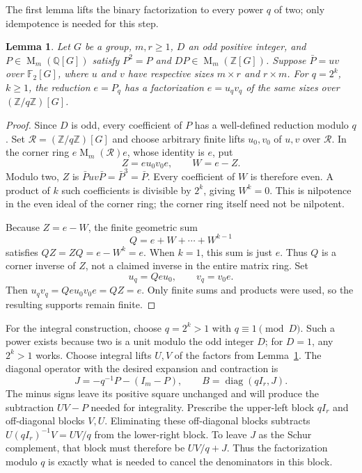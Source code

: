 \documentclass[11pt]{article}
\newtheorem{lemma}[theorem]{Lemma}
\theoremstyle{remark}
\numberwithin{equation}{section}
\newcommand{\F}{\mathbb F}
\newcommand{\Z}{\mathbb Z}
\newcommand{\Q}{\mathbb Q}
\newcommand{\Mat}{\operatorname{M}}
\newcommand{\diag}{\operatorname{diag}}
\begin{document}
The first lemma lifts the binary factorization to every
power $q$ of two; only idempotence is needed for this step.

\begin{lemma}\label{lem:lift}
Let $G$ be a group, $m,r\ge1$, $D$ an odd positive integer, and
$P\in\Mat_m(\Q[G])$ satisfy $P^2=P$ and
$DP\in\Mat_m(\Z[G])$. Suppose $\bar P=uv$ over $\F_2[G]$, where $u$ and $v$
have respective sizes $m\times r$ and $r\times m$. For $q=2^k$,
$k\ge1$, the reduction $e=P_q$ has a factorization
$e=u_qv_q$ of the same sizes over $(\Z/q\Z)[G]$.
\end{lemma}

\begin{proof}
Since $D$ is odd, every coefficient of $P$ has a well-defined
reduction modulo $q$. Set $\mathcal R=(\Z/q\Z)[G]$ and choose
arbitrary finite lifts $u_0,v_0$ of $u,v$ over $\mathcal R$.
In the corner ring $e\Mat_m(\mathcal R)e$, whose identity is $e$,
put
\[
 Z=eu_0v_0e,\qquad W=e-Z.
\]
Modulo two, $Z$ is $\bar Puv\bar P=\bar P^3=\bar P$.
Every coefficient of $W$ is therefore even. A product of $k$
such coefficients is divisible by $2^k$, giving $W^k=0$.
This is nilpotence in the even ideal of the corner ring; the
corner ring itself need not be nilpotent.

Because $Z=e-W$, the finite geometric sum
\[
 Q=e+W+\cdots+W^{k-1}
\]
satisfies $QZ=ZQ=e-W^k=e$. When $k=1$, this sum is just $e$.
Thus $Q$ is a corner inverse of $Z$, not a claimed inverse in
the entire matrix ring. Set
\[
 u_q=Qeu_0,\qquad v_q=v_0e.
\]
Then $u_qv_q=Qeu_0v_0e=QZ=e$. Only finite sums and products
were used, so the resulting supports remain finite.
\end{proof}

For the integral construction, choose $q=2^k>1$ with
$q\equiv1\pmod D$. Such a power exists because two is a unit
modulo the odd integer $D$; for $D=1$, any $2^k>1$ works.
Choose integral lifts $U,V$ of the factors from Lemma~\ref{lem:lift}.
The diagonal operator with the desired expansion and contraction is
\[
 J=-q^{-1}P-(I_m-P),\qquad B=\diag(qI_r,J).
\]
The minus signs leave its positive square unchanged and will produce
the subtraction $UV-P$ needed for integrality. Prescribe the
upper-left block $qI_r$ and off-diagonal blocks $V,U$. Eliminating
these off-diagonal blocks subtracts $U(qI_r)^{-1}V=UV/q$ from the
lower-right block. To leave $J$ as the Schur complement, that block
must therefore be $UV/q+J$. Thus the factorization modulo $q$ is exactly what is
needed to cancel the denominators in this block.
\end{document}
